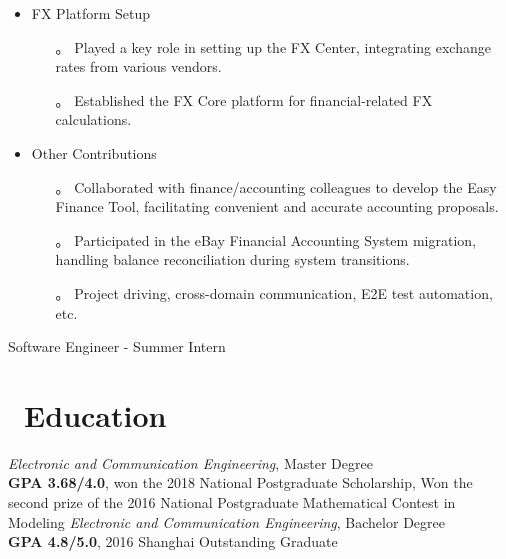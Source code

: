 \documentclass{resume}
\begin{document}
\begin{itemize}
  \item FX Platform Setup
  \begin{itemize}
    \item[。] Played a key role in setting up the FX Center, integrating exchange rates from various vendors.
    \item[。] Established the FX Core platform for financial-related FX calculations.
  \end{itemize}

\item Other Contributions
  \begin{itemize}
    \item[。] Collaborated with finance/accounting colleagues to develop the Easy Finance Tool, facilitating convenient and accurate accounting proposals.
    \item[。] Participated in the eBay Financial Accounting System migration, handling balance reconciliation during system transitions.
    \item[。] Project driving, cross-domain communication, E2E test automation, etc.
  \end{itemize}
\end{itemize}

Software Engineer - Summer Intern

\section{\faGraduationCap\ Education}
\textit{Electronic and Communication Engineering}, Master Degree
\\ \textbf{GPA 3.68/4.0}, won the 2018 National Postgraduate Scholarship, Won the second prize of the 2016 National Postgraduate Mathematical Contest in Modeling
\textit{Electronic and Communication Engineering}, Bachelor Degree
\\ \textbf{GPA 4.8/5.0}, 2016 Shanghai Outstanding Graduate



\end{document}
